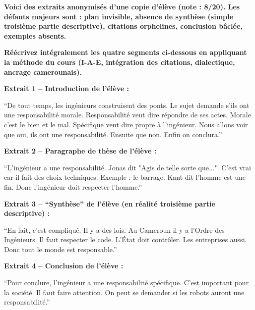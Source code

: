 \documentclass[11pt]{article}
\begin{document}
\begin{exercice}
\textbf{Voici des extraits anonymisés d'une copie d'élève (note : 8/20). Les défauts majeurs sont : plan invisible, absence de synthèse (simple troisième partie descriptive), citations orphelines, conclusion bâclée, exemples absents.}

\textbf{Réécrivez intégralement les quatre segments ci-dessous en appliquant la méthode du cours (I-A-E, intégration des citations, dialectique, ancrage camerounais).}

\textbf{Extrait 1 -- Introduction de l'élève :}

``De tout temps, les ingénieurs construisent des ponts. Le sujet demande s'ils ont une responsabilité morale. Responsabilité veut dire répondre de ses actes. Morale c'est le bien et le mal. Spécifique veut dire propre à l'ingénieur. Nous allons voir que oui, ils ont une responsabilité. Ensuite que non. Enfin on conclura.''

\textbf{Extrait 2 -- Paragraphe de thèse de l'élève :}

``L'ingénieur a une responsabilité. Jonas dit "Agis de telle sorte que...". C'est vrai car il fait des choix techniques. Exemple : le barrage. Kant dit l'homme est une fin. Donc l'ingénieur doit respecter l'homme.''

\textbf{Extrait 3 -- ``Synthèse'' de l'élève (en réalité troisième partie descriptive) :}

``En fait, c'est compliqué. Il y a des lois. Au Cameroun il y a l'Ordre des Ingénieurs. Il faut respecter le code. L'État doit contrôler. Les entreprises aussi. Donc tout le monde est responsable.''

\textbf{Extrait 4 -- Conclusion de l'élève :}

``Pour conclure, l'ingénieur a une responsabilité spécifique. C'est important pour la société. Il faut faire attention. On peut se demander si les robots auront une responsabilité.''


\end{exercice}
\end{document}
